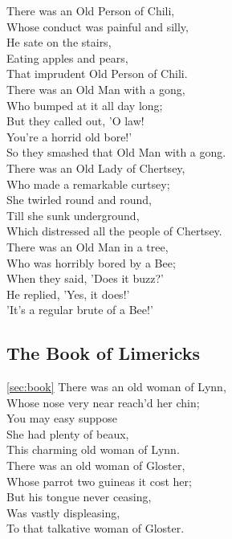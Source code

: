 There was an Old Person of Chili,\\
Whose conduct was painful and silly,\\
He sate on the stairs,\\
Eating apples and pears,\\
That imprudent Old Person of Chili.\\


There was an Old Man with a gong,\\
Who bumped at it all day long;\\
But they called out, 'O law!\\
You're a horrid old bore!'\\
So they smashed that Old Man with a gong.\\

There was an Old Lady of Chertsey,\\
Who made a remarkable curtsey;\\
She twirled round and round,\\
Till she sunk underground,\\
Which distressed all the people of Chertsey.\\

There was an Old Man in a tree,\\
Who was horribly bored by a Bee;\\
When they said, 'Does it buzz?'\\
He replied, 'Yes, it does!'\\
'It's a regular brute of a Bee!'\\

\subsection{The Book of Limericks}
\ref{sec:book}
There was an old woman of Lynn,\\
Whose nose very near reach'd her chin;\\
You may easy suppose\\
She had plenty of beaux,\\
This charming old woman of Lynn.\\

There was an old woman of Gloster,\\
Whose parrot two guineas it cost her;\\
But his tongue never ceasing,\\
Was vastly displeasing,\\
To that talkative woman of Gloster.\\

